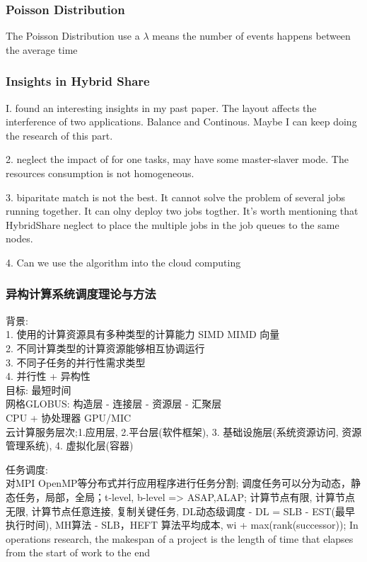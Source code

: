 \documentclass[UTF8]{article}
\begin{document}
\subsubsection{Poisson Distribution}
The Poisson Distribution use a $\lambda$ means the number of events happens between the average time 

\subsubsection{Insights in Hybrid Share}

I. found an interesting insights in my past paper. The layout affects the interference of two applications. Balance and Continous. Maybe I can keep doing the research of this part.

2. neglect the impact of for one tasks, may have some master-slaver mode. The resources consumption is not homogeneous.

3. biparitate match is not the best. It cannot solve the problem of several jobs running together. It can olny deploy two jobs togther. It's worth mentioning that HybridShare neglect to place the multiple jobs in the job queues to the same nodes.

4. Can we use the algorithm into the cloud computing

\subsubsection{异构计算系统调度理论与方法}
背景:\\
1. 使用的计算资源具有多种类型的计算能力 SIMD MIMD 向量 \\
2. 不同计算类型的计算资源能够相互协调运行 \\
3. 不同子任务的并行性需求类型 \\
4. 并行性 + 异构性 \\
目标: 最短时间\\
网格GLOBUS: 构造层 - 连接层 - 资源层 - 汇聚层\\
CPU + 协处理器 GPU/MIC \\
云计算服务层次;1.应用层, 2.平台层(软件框架), 3. 基础设施层(系统资源访问, 资源管理系统), 4. 虚拟化层(容器)

任务调度:\\对MPI OpenMP等分布式并行应用程序进行任务分割; 调度任务可以分为动态，静态任务，局部，全局；t-level, b-level => ASAP,ALAP; 计算节点有限, 计算节点无限, 计算节点任意连接, 复制关键任务, DL动态级调度 - DL = SLB - EST(最早执行时间), MH算法 - SLB，HEFT 算法平均成本, wi + max(rank(successor)); In operations research, the makespan of a project is the length of time that elapses from the start of work to the end
\end{document}
